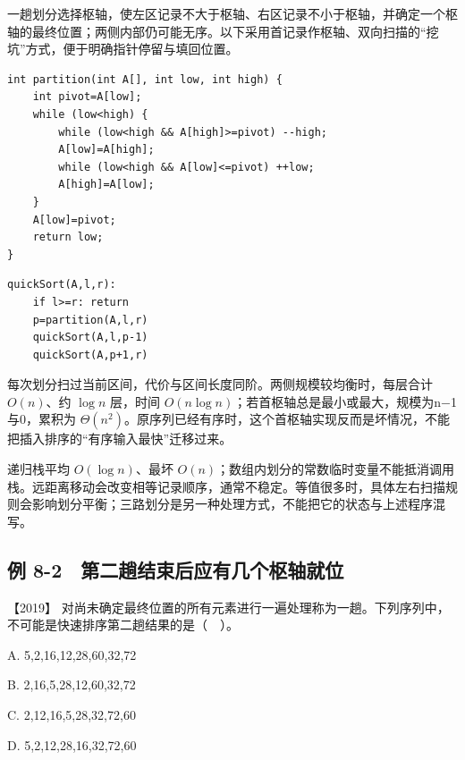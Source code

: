 一趟划分选择枢轴，使左区记录不大于枢轴、右区记录不小于枢轴，并确定一个枢轴的最终位置；两侧内部仍可能无序。以下采用首记录作枢轴、双向扫描的``挖坑''方式，便于明确指针停留与填回位置。

\par\medskip\noindent
\begin{minipage}{\linewidth}
\begin{verbatim}
int partition(int A[], int low, int high) {
    int pivot=A[low];
    while (low<high) {
        while (low<high && A[high]>=pivot) --high;
        A[low]=A[high];
        while (low<high && A[low]<=pivot) ++low;
        A[high]=A[low];
    }
    A[low]=pivot;
    return low;
}
\end{verbatim}
\end{minipage}\par\medskip

\par\medskip\noindent
\begin{minipage}{\linewidth}
\begin{verbatim}
quickSort(A,l,r):
    if l>=r: return
    p=partition(A,l,r)
    quickSort(A,l,p-1)
    quickSort(A,p+1,r)
\end{verbatim}
\end{minipage}\par\medskip

每次划分扫过当前区间，代价与区间长度同阶。两侧规模较均衡时，每层合计 \(O(n)\)、约 \(\log n\) 层，时间 \(O(n\log n)\)；若首枢轴总是最小或最大，规模为n−1与0，累积为 \(\Theta(n^2)\)。原序列已经有序时，这个首枢轴实现反而是坏情况，不能把插入排序的``有序输入最快''迁移过来。

递归栈平均 \(O(\log n)\)、最坏 \(O(n)\)；数组内划分的常数临时变量不能抵消调用栈。远距离移动会改变相等记录顺序，通常不稳定。等值很多时，具体左右扫描规则会影响划分平衡；三路划分是另一种处理方式，不能把它的状态与上述程序混写。

\subsection{例 8-2　第二趟结束后应有几个枢轴就位}\label{ds-ex8-2}

\noindent{}【2019】 对尚未确定最终位置的所有元素进行一遍处理称为一趟。下列序列中，不可能是快速排序第二趟结果的是（　）。

A. 5,2,16,12,28,60,32,72

B. 2,16,5,28,12,60,32,72

C. 2,12,16,5,28,32,72,60

D. 5,2,12,28,16,32,72,60

